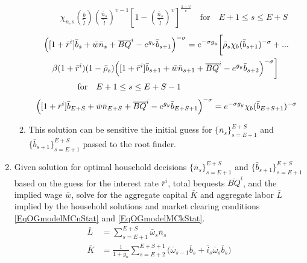 \documentclass[letterpaper,12pt]{article}
\theoremstyle{definition}
\begin{document}
\begin{enumerate}
\begin{enumerate}
\begin{equation}
\begin{split}
              & \quad \chi_{n,s}\left(\frac{b}{\tilde{l}}\right)\left(\frac{\bar{n}_{s}}{\tilde{l}}\right)^{\upsilon - 1}\left[1 - \left(\frac{\bar{n}_{s}}{\tilde{l}}\right)^\upsilon\right]^\frac{1-\upsilon}{\upsilon} \quad\text{for}\quad E+1\leq s\leq E+S
            \end{split}
          \end{equation}
          \begin{equation}\label{EqOGmodelEqlEulStat_bs_GammaSS2}
            \begin{split}
              &\Bigl([1 + \bar{r}^i]\bar{b}_{s} + \bar{w}\bar{n}_{s} + \overline{BQ}^i - e^{g_y}\bar{b}_{s+1}\Bigr)^{-\sigma} = e^{-\sigma g_y}\biggl[\bar{\rho}_s\chi_b(\bar{b}_{s+1})^{-\sigma} + ...\\
              &\quad \beta(1+\bar{r}^i)(1 - \bar{\rho}_s)\Bigl([1 + \bar{r}^i]\bar{b}_{s+1} + \bar{w}\bar{n}_{s+1} + \overline{BQ}^i - e^{g_y}\bar{b}_{s+2}\Bigr)^{-\sigma}\biggr] \\
              &\qquad\qquad\text{for}\quad E+1\leq s\leq E+S-1
            \end{split}
          \end{equation}
          \begin{equation}\label{EqOGmodelEqlEulStat_bS_GammaSS2}
            \Bigl([1 + \bar{r}^i]\bar{b}_{E+S} + \bar{w}\bar{n}_{E+S} + \overline{BQ}^i - e^{g_y}\bar{b}_{E+S+1}\Bigr)^{-\sigma} = e^{-\sigma g_y}\chi_b(\bar{b}_{E+S+1})^{-\sigma}
          \end{equation}
          \item This solution can be sensitive the initial guess for $\{\bar{n}_s\}_{s=E+1}^{E+S}$ and $\{\bar{b}_{s+1}\}_{s=E+1}^{E+S}$ passed to the root finder.
        \end{enumerate}
      \item Given solution for optimal household decisions $\{\bar{n}_s\}_{s=E+1}^{E+S}$ and $\{\bar{b}_{s+1}\}_{s=E+1}^{E+S}$ based on the guess for the interest rate $\bar{r}^i$, total bequests $\overline{BQ}^i$, and the implied wage $\bar{w}$, solve for the aggregate capital $\bar{K}$ and aggregate labor $\bar{L}$ implied by the household solutions and market clearing conditions \eqref{EqOGmodelMCnStat} and \eqref{EqOGmodelMCkStat}.
      \begin{align}
        \bar{L} &= \sum_{s=E+1}^{E+S}\bar{\omega}_{s}\bar{n}_{s} \label{EqOGmodelMCnStatSS} \\
        \bar{K} &= \frac{1}{1 + \bar{g}_n}\sum_{s=E+2}^{E+S+1}\bigl(\bar{\omega}_{s-1}\bar{b}_{s} + \bar{i}_{s}\bar{\omega}_{s}\bar{b}_{s}\bigr) \label{EqOGmodelMCkStatSS}

\end{align}
\end{enumerate}
\end{document}
